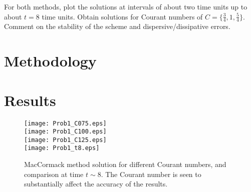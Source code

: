 \documentclass[11pt]{article}
\begin{document}
For both methods, plot the solutions at intervals of about two time units up to about $t=8$ time units. Obtain solutions for Courant numbers of $C = \{\tfrac{3}{4}, 1, \tfrac{5}{4}\}$. Comment on the stability of the scheme and dispersive/dissipative errors.

\section{Methodology} %

\section{Results} %

\begin{figure}[h!]
\begin{center}
\texttt{[image: Prob1\_C075.eps]} \\
\texttt{[image: Prob1\_C100.eps]} \\
\texttt{[image: Prob1\_C125.eps]} \\
\texttt{[image: Prob1\_t8.eps]}
\\[0.5cm]
\caption{MacCormack method solution for different Courant numbers, and comparison at time $t \sim 8$. The Courant number is seen to substantially affect the accuracy of the results.}
\label{fig:MacCormack}
\end{center}
\end{figure}
\end{document}
